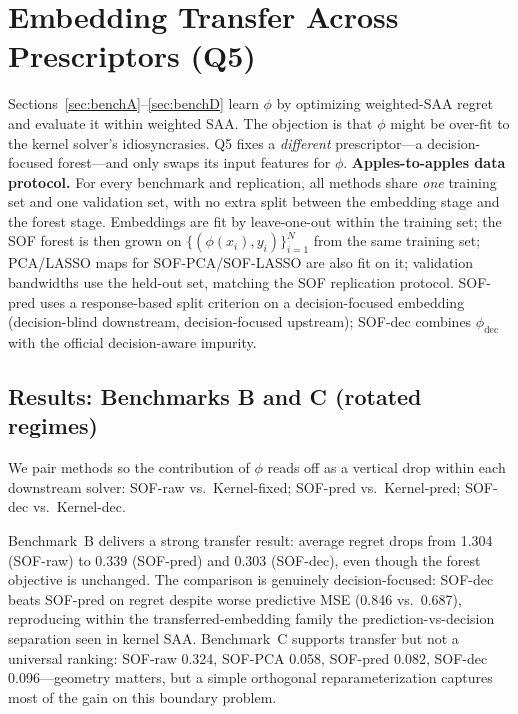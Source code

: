 \documentclass[11pt]{article}
\begin{document}
\section{Embedding Transfer Across Prescriptors (Q5)}\label{sec:sof_transfer}

Sections~\ref{sec:benchA}--\ref{sec:benchD} learn $\phi$ by optimizing weighted-SAA regret and evaluate it within weighted SAA. The objection is that $\phi$ might be over-fit to the kernel solver's idiosyncrasies. Q5 fixes a \emph{different} prescriptor---a decision-focused forest---and only swaps its input features for $\phi$. \textbf{Apples-to-apples data protocol.} For every benchmark and replication, all methods share \emph{one} training set and one validation set, with no extra split between the embedding stage and the forest stage. Embeddings are fit by leave-one-out within the training set; the SOF forest is then grown on $\{(\phi(x_i),y_i)\}_{i=1}^N$ from the same training set; PCA/LASSO maps for SOF-PCA/SOF-LASSO are also fit on it; validation bandwidths use the held-out set, matching the SOF replication protocol. SOF-pred uses a response-based split criterion on a decision-focused embedding (decision-blind downstream, decision-focused upstream); SOF-dec combines $\phi_{\mathrm{dec}}$ with the official decision-aware impurity.

\subsection*{Results: Benchmarks B and C (rotated regimes)}
We pair methods so the contribution of $\phi$ reads off as a vertical drop within each downstream solver: SOF-raw vs.\ Kernel-fixed; SOF-pred vs.\ Kernel-pred; SOF-dec vs.\ Kernel-dec.

\begin{table}[H]
\centering
\footnotesize
\setlength{\tabcolsep}{4pt}

\caption{Embedding-aware SOF summary on Benchmarks B and C: average regret, predictive MSE, and number of replications (out of 20) that beat SOF-raw.}
\label{tab:benchmark_bc_plugin}
\end{table}

Benchmark~B delivers a strong transfer result: average regret drops from 1.304 (SOF-raw) to 0.339 (SOF-pred) and 0.303 (SOF-dec), even though the forest objective is unchanged. The comparison is genuinely decision-focused: SOF-dec beats SOF-pred on regret despite worse predictive MSE (0.846 vs.\ 0.687), reproducing within the transferred-embedding family the prediction-vs-decision separation seen in kernel SAA. Benchmark~C supports transfer but not a universal ranking: SOF-raw 0.324, SOF-PCA 0.058, SOF-pred 0.082, SOF-dec 0.096---geometry matters, but a simple orthogonal reparameterization captures most of the gain on this boundary problem.
\end{document}
